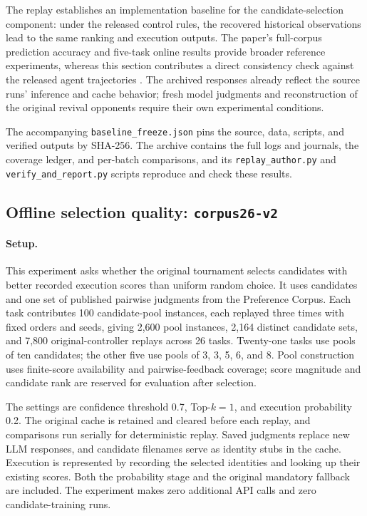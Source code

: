 The replay establishes an implementation baseline for the candidate-selection component: under the released control rules, the recovered historical observations lead to the same ranking and execution outputs. The paper's full-corpus prediction accuracy and five-task online results provide broader reference experiments, whereas this section contributes a direct consistency check against the released agent trajectories \citep{zheng2026predict}. The archived responses already reflect the source runs' inference and cache behavior; fresh model judgments and reconstruction of the original revival opponents require their own experimental conditions.

The accompanying \texttt{baseline\_freeze.json} pins the source, data, scripts, and verified outputs by SHA-256. The archive contains the full logs and journals, the coverage ledger, and per-batch comparisons, and its \texttt{replay\_author.py} and \texttt{verify\_and\_report.py} scripts reproduce and check these results.


\subsection{Offline selection quality: \texttt{corpus26-v2}}
\label{sec:offline-selection}

\paragraph{Setup.}
This experiment asks whether the original tournament selects candidates with better recorded execution scores than uniform random choice. It uses candidates and one set of published pairwise judgments from the Preference Corpus. Each task contributes 100 candidate-pool instances, each replayed three times with fixed orders and seeds, giving 2,600 pool instances, 2,164 distinct candidate sets, and 7,800 original-controller replays across 26 tasks. Twenty-one tasks use pools of ten candidates; the other five use pools of 3, 3, 5, 6, and 8. Pool construction uses finite-score availability and pairwise-feedback coverage; score magnitude and candidate rank are reserved for evaluation after selection.

The settings are confidence threshold 0.7, Top-$k=1$, and execution probability 0.2. The original cache is retained and cleared before each replay, and comparisons run serially for deterministic replay. Saved judgments replace new LLM responses, and candidate filenames serve as identity stubs in the cache. Execution is represented by recording the selected identities and looking up their existing scores. Both the probability stage and the original mandatory fallback are included. The experiment makes zero additional API calls and zero candidate-training runs.

